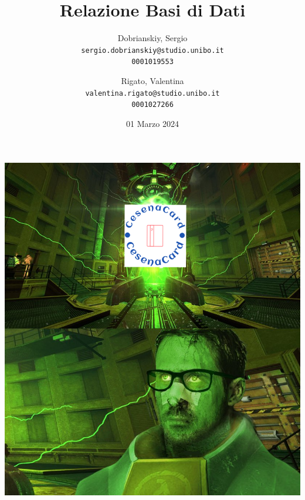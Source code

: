 \documentclass{article}
\title{Relazione Basi di Dati}
\author{
  Dobrianskiy, Sergio \\
  \texttt{sergio.dobrianskiy@studio.unibo.it}\\
  \texttt{0001019553}
  \and
  Rigato, Valentina\\
  \texttt{valentina.rigato@studio.unibo.it}\\
  \texttt{0001027266}
}
\date{01 Marzo 2024}
\begin{document}
 
\maketitle
\includegraphics[width=0.95\columnwidth]{CesenaCard2.png}
\newpage

\tableofcontents
\clearpage

% 



% 

% 
\end{document}

